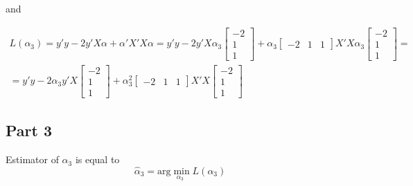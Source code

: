 \documentclass[12pt, a4paper]{article}\usepackage[]{graphicx}\usepackage[]{color}
\begin{document}
and

\begin{gather*}
L(\alpha_3) = y'y - 2y'X\alpha + \alpha'X'X\alpha = 
  y'y - 2y'X\alpha_3 \begin{bmatrix} -2 \\ 1 \\ 1 \end{bmatrix} 
  + \alpha_3 \begin{bmatrix} -2 & 1 & 1 \end{bmatrix} X'X \alpha_3 \begin{bmatrix} -2 \\ 1 \\ 1 \end{bmatrix} 
  = \\
  = y'y - 2\alpha_3 y'X \begin{bmatrix} -2 \\ 1 \\ 1 \end{bmatrix} 
  + \alpha_3^2 \begin{bmatrix} -2 & 1 & 1 \end{bmatrix} X'X \begin{bmatrix} -2 \\ 1 \\ 1 \end{bmatrix}
\end{gather*}



\subsection{Part 3}
Estimator of $\alpha_3$ is equal to 
\[ \hat{\alpha}_3 = \text{arg}\min_{\alpha_3\ \ } L(\alpha_3) \]
\end{document}
